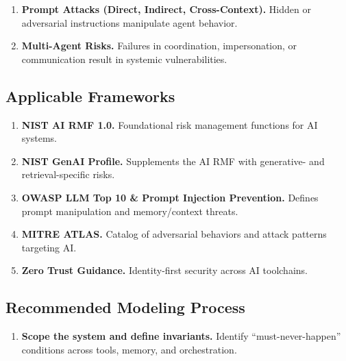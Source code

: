 \begin{TNtwocol}
\begin{enumerate}
            \item \textbf{Prompt Attacks (Direct, Indirect, Cross-Context).}
                  Hidden or adversarial instructions manipulate agent behavior.\cite{OWASP_LLM_Top10_PDF,OWASP_Prompt_Injection_CS}

            \item \textbf{Multi-Agent Risks.}
                  Failures in coordination, impersonation, or communication result in systemic vulnerabilities.\cite{MITRE_ATLAS}
      \end{enumerate}

      \subsection{Applicable Frameworks}

      \begin{enumerate}
            \item \textbf{NIST AI RMF 1.0.} Foundational risk management functions for AI systems.\cite{NIST_AI_RMF_100_1}
            \item \textbf{NIST GenAI Profile.} Supplements the AI RMF with generative- and retrieval-specific risks.\cite{NIST_GenAI_Profile_600_1}
            \item \textbf{OWASP LLM Top 10 \& Prompt Injection Prevention.} Defines prompt manipulation and memory/context threats.\cite{OWASP_LLM_Top10,OWASP_Prompt_Injection_CS}
            \item \textbf{MITRE ATLAS.} Catalog of adversarial behaviors and attack patterns targeting AI.\cite{MITRE_ATLAS}
            \item \textbf{Zero Trust Guidance.} Identity-first security across AI toolchains.\cite{NIST_SP800_207,NIST_SP800_207A,CISA_ZTMM_v2}
      \end{enumerate}

      \subsection{Recommended Modeling Process}

      \begin{enumerate}
            \item \textbf{Scope the system and define invariants.}
                  Identify “must-never-happen'' conditions across tools, memory, and orchestration.\cite{NIST_AI_RMF_100_1}


\end{enumerate}
\end{TNtwocol}
